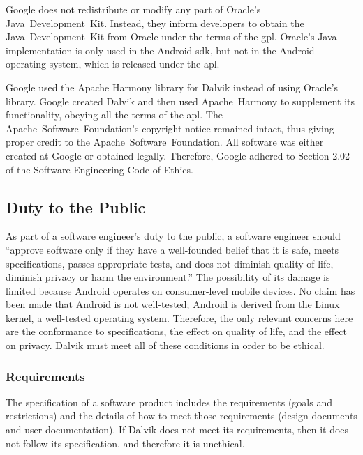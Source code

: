 \documentclass[11pt]{article}
\begin{document}
\begin{multicols}{2}
Google does not redistribute or modify any part of Oracle's
Java~Development~Kit.  Instead, they inform developers to obtain the
Java~Development~Kit from Oracle under the terms of the \gls{gpl}.  Oracle's
Java implementation is only used in the Android \gls{sdk}, but not in the
Android operating system, which is released under the \gls{apl}.

Google used the Apache Harmony \gls{library} for Dalvik instead of using
Oracle's \gls{library}.  Google created Dalvik and then used Apache~Harmony to
supplement its functionality, obeying all the terms of the \gls{apl}.  The
Apache~Software~Foundation's copyright notice remained intact, thus giving
proper credit to the Apache~Software~Foundation. All software was either created
at Google or obtained legally.  Therefore, Google adhered to Section 2.02 of the
Software Engineering Code of Ethics.



\subsection{Duty to the Public} %
\label{sub:public}

As part of a software engineer's duty to the public, a software engineer should
``approve software only if they have a well-founded belief that it is safe,
meets specifications, passes appropriate tests, and does not diminish quality of
life, diminish privacy or harm the environment.'' \cite[\S1.03]{secode}  The
possibility of its damage is limited because Android operates on consumer-level
mobile devices.  No claim has been made that Android is not well-tested; Android
is derived from the Linux kernel, a well-tested operating system.  Therefore,
the only relevant concerns here are the conformance to specifications, the
effect on quality of life, and the effect on privacy.  Dalvik must meet all of
these conditions in order to be ethical.

\subsubsection{Requirements} %
\label{ssub:requirements}

The specification of a software product includes the requirements (goals and
restrictions) and the details of how to meet those requirements (design
documents and user documentation).  If Dalvik does not meet its requirements,
then it does not follow its specification, and therefore it is unethical.


\end{multicols}
\end{document}
